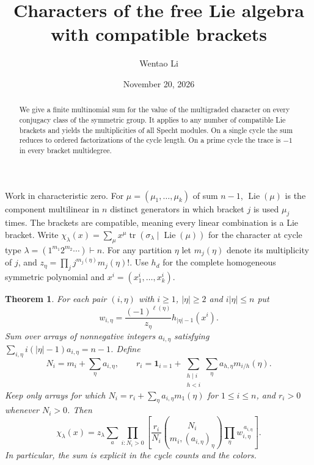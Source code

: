 \documentclass[11pt]{article}
\title{Characters of the free Lie algebra with compatible brackets}
\author{Wentao Li}
\date{November 20, 2026}
\newtheorem{theorem}{Theorem}
\begin{document}
\maketitle
\begin{abstract}
We give a finite multinomial sum for the value of the multigraded character
on every conjugacy class of the symmetric group. It applies to any number of
compatible Lie brackets and yields the multiplicities of all Specht modules.
On a single cycle the sum reduces to ordered factorizations of the cycle
length. On a prime cycle the trace is $-1$ in every bracket multidegree.
\end{abstract}
Work in characteristic zero. For $\mu=(\mu_1,\ldots,\mu_k)$ of sum $n-1$,
$\operatorname{Lie}(\mu)$ is the component multilinear in $n$ distinct
generators in which bracket $j$ is used $\mu_j$ times. The brackets are
compatible, meaning every linear combination is a Lie bracket. Write
$\chi_\lambda(x)=\sum_\mu x^\mu
\operatorname{tr}(\sigma_\lambda\mid\operatorname{Lie}(\mu))$ for the
character at cycle type $\lambda=(1^{m_1}2^{m_2}\cdots)\vdash n$.
For any partition $\eta$ let $m_j(\eta)$ denote its multiplicity of $j$,
and $z_\eta=\prod_j j^{m_j(\eta)}m_j(\eta)!$.
Use $h_d$ for the complete homogeneous symmetric polynomial and
$x^i=(x_1^i,\ldots,x_k^i)$.

\begin{theorem}
For each pair $(i,\eta)$ with $i\ge1$, $|\eta|\ge2$ and $i|\eta|\le n$ put
\[
 w_{i,\eta}=\frac{(-1)^{\ell(\eta)}}{z_\eta}h_{|\eta|-1}(x^i).
\]
Sum over arrays of nonnegative integers $a_{i,\eta}$ satisfying
$\sum_{i,\eta}i(|\eta|-1)a_{i,\eta}=n-1$. Define
\[
 N_i=m_i+\sum_\eta a_{i,\eta},\qquad
 r_i=\mathbf1_{i=1}
       +\sum_{\substack{h\mid i\\h<i}}\sum_\eta a_{h,\eta}m_{i/h}(\eta).
\]
Keep only arrays for which $N_i=r_i+\sum_\eta a_{i,\eta}m_1(\eta)$ for
$1\le i\le n$, and $r_i>0$ whenever $N_i>0$. Then
\[
 \boxed{\displaystyle
 \chi_\lambda(x)=z_\lambda\sum_a
 \prod_{i:N_i>0}\left[
 \frac{r_i}{N_i}\binom{N_i}{m_i,(a_{i,\eta})_\eta}
             \prod_{\eta}w_{i,\eta}^{\,a_{i,\eta}}\right].}
                                                                    \tag{1}
\]
In particular, the sum is explicit in the cycle counts and the colors.
\end{theorem}
\end{document}
